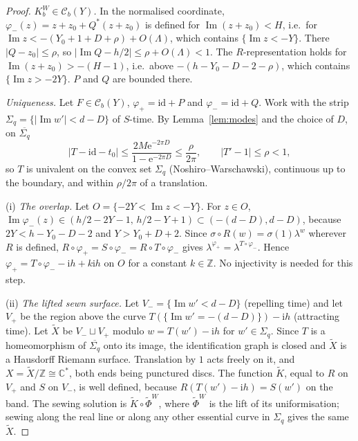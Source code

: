 \documentclass[11pt,a4paper]{article}
\theoremstyle{definition}
\newcommand{\Rr}{R}
\newcommand{\Kk}{K}
\newcommand{\eee}{\mathrm{e}}
\newcommand{\ii}{\mathrm{i}}
\begin{document}
\begin{proof}
\emph{$\Kk^W_b\in\mathcal C_b(Y)$.}  In the normalised coordinate,
$\varphi_-(z)=z+z_0+Q^*(z+z_0)$ is defined for
$\operatorname{Im}(z+z_0)<H$, i.e.\ for $\operatorname{Im}z<-(Y_0+1+D+\rho)+O(\Lambda)$,
which contains $\{\operatorname{Im}z<-Y\}$.  There $|Q-z_0|\le\rho$, so
$|\operatorname{Im}Q-h/2|\le\rho+O(\Lambda)<1$.  The $\Rr$-representation holds
for $\operatorname{Im}(z+z_0)>-(H-1)$, i.e.\ above
$-(h-Y_0-D-2-\rho)$, which contains $\{\operatorname{Im}z>-2Y\}$.  $P$ and $Q$
are bounded there.

\emph{Uniqueness.}  Let $F\in\mathcal C_b(Y)$, $\varphi_+=\mathrm{id}+P$ and
$\varphi_-=\mathrm{id}+Q$.  Work with the strip
$\Sigma_q=\{|\operatorname{Im}w'|<d-D\}$ of $S$-time.  By Lemma~\ref{lem:modes} and
the choice of $D$, on $\overline{\Sigma_q}$
\[
 |T-\mathrm{id}-t_0|\le\frac{2M\eee^{-2\pi D}}{1-\eee^{-2\pi D}}\le\frac{\rho}{2\pi},\qquad
 |T'-1|\le\rho<1 ,
\]
so $T$ is univalent on the convex set $\Sigma_q$ (Noshiro--Warschawski),
continuous up to the boundary, and within $\rho/2\pi$ of a translation.

(i) \emph{The overlap.}  Let $O=\{-2Y<\operatorname{Im}z<-Y\}$.  For $z\in O$,
$\operatorname{Im}\varphi_-(z)\in(h/2-2Y-1,\,h/2-Y+1)\subset(-(d-D),d-D)$,
because $2Y<h-Y_0-D-2$ and $Y>Y_0+D+2$.  Since
$\sigma\circ\Rr(w)=\sigma(1)\lambda^w$ wherever $\Rr$ is defined,
$\Rr\circ\varphi_+=S\circ\varphi_-=\Rr\circ T\circ\varphi_-$ gives
$\lambda^{\varphi_+}=\lambda^{T\circ\varphi_-}$.  Hence
$\varphi_+=T\circ\varphi_--\ii h+k\ii h$ on $O$ for a constant $k\in\mathbb Z$.
No injectivity is needed for this step.

(ii) \emph{The lifted sewn surface.}  Let $V_-=\{\operatorname{Im}w'<d-D\}$
(repelling time) and let $V_+$ be the region above the curve
$T(\{\operatorname{Im}w'=-(d-D)\})-\ii h$ (attracting time).  Let $\tilde X$ be
$V_-\sqcup V_+$ modulo $w=T(w')-\ii h$ for $w'\in\Sigma_q$.  Since $T$ is a
homeomorphism of $\overline{\Sigma_q}$ onto its image, the identification
graph is closed and $\tilde X$ is a Hausdorff Riemann surface.  Translation by
$1$ acts freely on it, and $X=\tilde X/\mathbb Z\cong\mathbb C^*$, both ends
being punctured discs.  The function $\tilde K$, equal to $\Rr$ on $V_+$ and
$S$ on $V_-$, is well defined, because $\Rr(T(w')-\ii h)=S(w')$ on the band.
The sewing solution is $\tilde K\circ\tilde\Phi^W$, where $\tilde\Phi^W$ is the
lift of its uniformisation; sewing along the real line or along any other
essential curve in $\Sigma_q$ gives the same $\tilde X$.


\end{proof}
\end{document}
